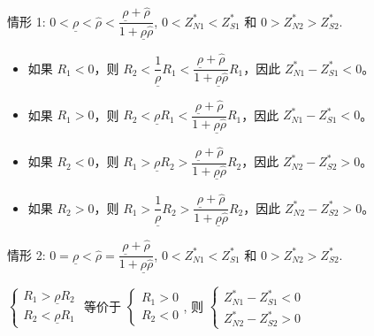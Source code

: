 \documentclass[10.0pt]{article}
\begin{document}
情形 1: $ 0 < \underline{\rho} < {\hat \rho} < \dfrac{\underline{\rho} + {\hat \rho}}{1 + \underline{\rho} {\hat \rho}} $, $ 0 < Z_{N 1}^* < Z_{S 1}^* $ 和 $ 0 > Z_{N 2}^* > Z_{S 2}^* $.
\begin{itemize}
\item 如果 $ R_1 < 0 $，则 $ R_2 < \dfrac{1}{\underline{\rho}} R_1 < \dfrac{\underline{\rho} + {\hat \rho}}{1 + \underline {\rho} {\hat \rho}} R_1 $，因此 $ Z_{N 1}^* - Z_{S 1}^* < 0 $。
\item 如果 $ R_1 > 0 $，则 $ R_2 < \underline{\rho} R_1 < \dfrac{\underline{\rho} + {\hat \rho}}{1 + \underline{\rho} {\hat \rho}} R_1 $，因此 $ Z_{N 1}^* - Z_{S 1}^* < 0 $。
\item 如果 $ R_2 < 0 $，则 $ R_1 > \underline{\rho} R_2 > \dfrac{\underline{\rho} + {\hat \rho}}{1 + \underline{\rho} {\hat \rho}} R_2 $，因此 $ Z_{N 2}^* - Z_{S 2}^* > 0 $。
\item 如果 $ R_2 > 0 $，则 $ R_1 > \dfrac{1}{\underline{\rho}} R_2 > \dfrac{\underline{\rho} + {\hat \rho}}{1 + \underline {\rho} {\hat \rho}} R_2 $，因此 $ Z_{N 2}^* - Z_{S 2}^* > 0 $。
\end{itemize}

情形 2: $ 0 = \underline{\rho} < {\hat \rho} = \dfrac{\underline{\rho} + {\hat \rho}}{1 + \underline{\rho} {\hat \rho}} $, $ 0 < Z_{N 1}^* < Z_{S 1}^* $ 和 $ 0 > Z_{N 2}^* > Z_{S 2}^* $.

$ \left\{ \begin{matrix} R_1 > \underline{\rho} R_2 \\ R_2 < \underline{\rho} R_1 \end{matrix} \right. $ 等价于 $ \left\{ \begin{matrix} R_1 > 0 \\ R_2 < 0 \end{matrix} \right. $, 则 $ \left\{ \begin{matrix} Z_{N 1}^* - Z_{S 1}^* < 0 \\ Z_{N 2}^* - Z_{S 2}^* > 0 \end{matrix} \right. $
\end{document}
